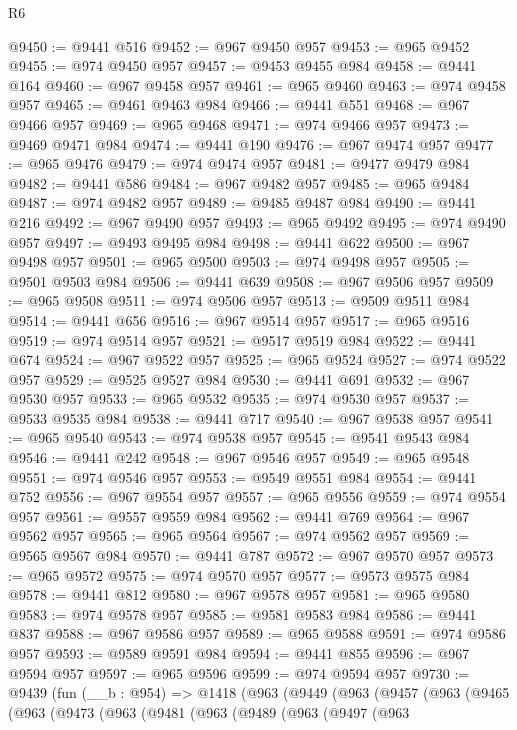 \begin{lexlean}{R6}
\begin{coremodule}
@9450 := @9441 @516
@9452 := @967 @9450 @957
@9453 := @965 @9452
@9455 := @974 @9450 @957
@9457 := @9453 @9455 @984
@9458 := @9441 @164
@9460 := @967 @9458 @957
@9461 := @965 @9460
@9463 := @974 @9458 @957
@9465 := @9461 @9463 @984
@9466 := @9441 @551
@9468 := @967 @9466 @957
@9469 := @965 @9468
@9471 := @974 @9466 @957
@9473 := @9469 @9471 @984
@9474 := @9441 @190
@9476 := @967 @9474 @957
@9477 := @965 @9476
@9479 := @974 @9474 @957
@9481 := @9477 @9479 @984
@9482 := @9441 @586
@9484 := @967 @9482 @957
@9485 := @965 @9484
@9487 := @974 @9482 @957
@9489 := @9485 @9487 @984
@9490 := @9441 @216
@9492 := @967 @9490 @957
@9493 := @965 @9492
@9495 := @974 @9490 @957
@9497 := @9493 @9495 @984
@9498 := @9441 @622
@9500 := @967 @9498 @957
@9501 := @965 @9500
@9503 := @974 @9498 @957
@9505 := @9501 @9503 @984
@9506 := @9441 @639
@9508 := @967 @9506 @957
@9509 := @965 @9508
@9511 := @974 @9506 @957
@9513 := @9509 @9511 @984
@9514 := @9441 @656
@9516 := @967 @9514 @957
@9517 := @965 @9516
@9519 := @974 @9514 @957
@9521 := @9517 @9519 @984
@9522 := @9441 @674
@9524 := @967 @9522 @957
@9525 := @965 @9524
@9527 := @974 @9522 @957
@9529 := @9525 @9527 @984
@9530 := @9441 @691
@9532 := @967 @9530 @957
@9533 := @965 @9532
@9535 := @974 @9530 @957
@9537 := @9533 @9535 @984
@9538 := @9441 @717
@9540 := @967 @9538 @957
@9541 := @965 @9540
@9543 := @974 @9538 @957
@9545 := @9541 @9543 @984
@9546 := @9441 @242
@9548 := @967 @9546 @957
@9549 := @965 @9548
@9551 := @974 @9546 @957
@9553 := @9549 @9551 @984
@9554 := @9441 @752
@9556 := @967 @9554 @957
@9557 := @965 @9556
@9559 := @974 @9554 @957
@9561 := @9557 @9559 @984
@9562 := @9441 @769
@9564 := @967 @9562 @957
@9565 := @965 @9564
@9567 := @974 @9562 @957
@9569 := @9565 @9567 @984
@9570 := @9441 @787
@9572 := @967 @9570 @957
@9573 := @965 @9572
@9575 := @974 @9570 @957
@9577 := @9573 @9575 @984
@9578 := @9441 @812
@9580 := @967 @9578 @957
@9581 := @965 @9580
@9583 := @974 @9578 @957
@9585 := @9581 @9583 @984
@9586 := @9441 @837
@9588 := @967 @9586 @957
@9589 := @965 @9588
@9591 := @974 @9586 @957
@9593 := @9589 @9591 @984
@9594 := @9441 @855
@9596 := @967 @9594 @957
@9597 := @965 @9596
@9599 := @974 @9594 @957
@9730 := @9439
    (fun (__b : @954) =>
    @1418
      (@963
        (@9449
          (@963
            (@9457
              (@963
                (@9465
                  (@963
                    (@9473
                      (@963
                        (@9481
                          (@963
                            (@9489
                              (@963
                                (@9497
                                  (@963

\end{coremodule}
\end{lexlean}
